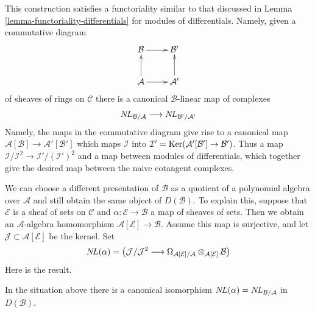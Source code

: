 \noindent
This construction satisfies a functoriality similar to that discussed
in Lemma \ref{lemma-functoriality-differentials} for modules of differentials.
Namely, given a commutative diagram
\begin{equation}
\label{equation-commutative-square-sheaves}
\vcenter{
\xymatrix{
\mathcal{B} \ar[r] & \mathcal{B}' \\
\mathcal{A} \ar[u] \ar[r] & \mathcal{A}' \ar[u]
}
}
\end{equation}
of sheaves of rings on $\mathcal{C}$ there is a canonical
$\mathcal{B}$-linear map of complexes
$$
\mathop{N\!L}\nolimits_{\mathcal{B}/\mathcal{A}} \longrightarrow \mathop{N\!L}\nolimits_{\mathcal{B}'/\mathcal{A}'}
$$
Namely, the maps in the commutative diagram give rise to a canonical map
$\mathcal{A}[\mathcal{B}] \to \mathcal{A}'[\mathcal{B}']$
which maps $\mathcal{I}$ into
$\mathcal{I}' = \mathop{\mathrm{Ker}}(\mathcal{A}'[\mathcal{B}'] \to \mathcal{B}')$.
Thus a map $\mathcal{I}/\mathcal{I}^2 \to \mathcal{I}'/(\mathcal{I}')^2$
and a map between modules of differentials, which together give the
desired map between the naive cotangent complexes.

\medskip\noindent
We can choose a different presentation of $\mathcal{B}$ as a quotient of a
polynomial algebra over $\mathcal{A}$ and still obtain the same object
of $D(\mathcal{B})$. To explain this, suppose that $\mathcal{E}$ is
a sheaf of sets on $\mathcal{C}$ and $\alpha : \mathcal{E} \to \mathcal{B}$
a map of sheaves of sets. Then we obtain an $\mathcal{A}$-algebra
homomorphism $\mathcal{A}[\mathcal{E}] \to \mathcal{B}$. Assume this map
is surjective, and let $\mathcal{J} \subset \mathcal{A}[\mathcal{E}]$
be the kernel. Set
$$
\mathop{N\!L}\nolimits(\alpha) = \left(
\mathcal{J}/\mathcal{J}^2
\longrightarrow
\Omega_{\mathcal{A}[\mathcal{E}]/\mathcal{A}}
\otimes_{\mathcal{A}[\mathcal{E}]} \mathcal{B}\right)
$$
Here is the result.

\begin{lemma}
\label{lemma-NL-up-to-qis}
In the situation above there is a canonical isomorphism
$\mathop{N\!L}\nolimits(\alpha) = \mathop{N\!L}\nolimits_{\mathcal{B}/\mathcal{A}}$ in $D(\mathcal{B})$.
\end{lemma}

